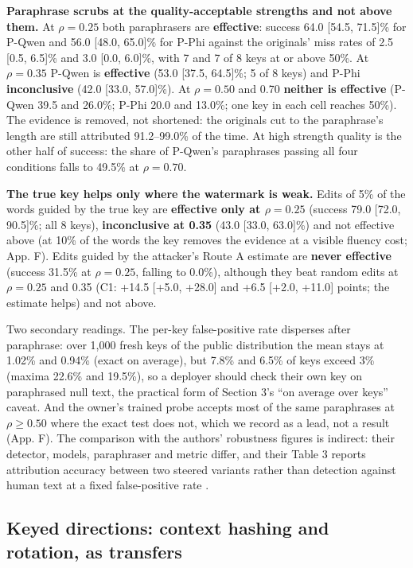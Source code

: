 \documentclass[11pt,letterpaper]{article}
\begin{document}
\textbf{Paraphrase scrubs at the quality-acceptable strengths and not above them.} At \(\rho = 0.25\) both paraphrasers are \textbf{effective}: success 64.0 {[}54.5, 71.5{]}\% for P-Qwen and 56.0 {[}48.0, 65.0{]}\% for P-Phi against the originals' miss rates of 2.5 {[}0.5, 6.5{]}\% and 3.0 {[}0.0, 6.0{]}\%, with 7 and 7 of 8 keys at or above 50\%. At \(\rho = 0.35\) P-Qwen is \textbf{effective} (53.0 {[}37.5, 64.5{]}\%; 5 of 8 keys) and P-Phi \textbf{inconclusive} (42.0 {[}33.0, 57.0{]}\%). At \(\rho = 0.50\) and 0.70 \textbf{neither is effective} (P-Qwen 39.5 and 26.0\%; P-Phi 20.0 and 13.0\%; one key in each cell reaches 50\%). The evidence is removed, not shortened: the originals cut to the paraphrase's length are still attributed 91.2--99.0\% of the time. At high strength quality is the other half of success: the share of P-Qwen's paraphrases passing all four conditions falls to 49.5\% at \(\rho = 0.70\).

\textbf{The true key helps only where the watermark is weak.} Edits of 5\% of the words guided by the true key are \textbf{effective only at \(\rho = 0.25\)} (success 79.0 {[}72.0, 90.5{]}\%; all 8 keys), \textbf{inconclusive at 0.35} (43.0 {[}33.0, 63.0{]}\%) and not effective above (at 10\% of the words the key removes the evidence at a visible fluency cost; App. F). Edits guided by the attacker's Route A estimate are \textbf{never effective} (success 31.5\% at \(\rho = 0.25\), falling to 0.0\%), although they beat random edits at \(\rho = 0.25\) and 0.35 (C1: +14.5 {[}+5.0, +28.0{]} and +6.5 {[}+2.0, +11.0{]} points; the estimate helps) and not above.

Two secondary readings. The per-key false-positive rate disperses after paraphrase: over 1,000 fresh keys of the public distribution the mean stays at 1.02\% and 0.94\% (exact on average), but 7.8\% and 6.5\% of keys exceed 3\% (maxima 22.6\% and 19.5\%), so a deployer should check their own key on paraphrased null text, the practical form of Section 3's ``on average over keys'' caveat. And the owner's trained probe accepts most of the same paraphrases at \(\rho \geq 0.50\) where the exact test does not, which we record as a lead, not a result (App. F). The comparison with the authors' robustness figures is indirect: their detector, models, paraphraser and metric differ, and their Table 3 reports attribution accuracy between two steered variants rather than detection against human text at a fixed false-positive rate \citep{ardoin2026selfrecognition}.

\hypertarget{keyed-directions-context-hashing-and-rotation-as-transfers}{%
\subsection{Keyed directions: context hashing and rotation, as transfers}\label{keyed-directions-context-hashing-and-rotation-as-transfers}}
\end{document}
